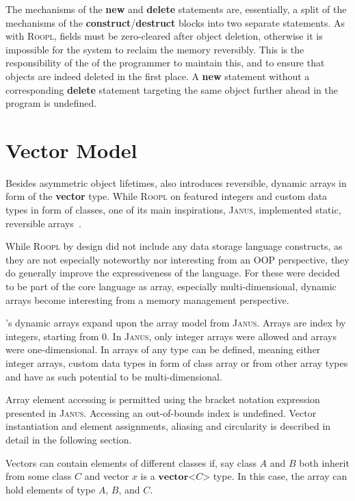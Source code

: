 The mechanisms of the \textbf{new} and \textbf{delete} statements are, essentially, a split of the mechanisms of the \textbf{construct}/\textbf{destruct} blocks into two separate statements. As with \textsc{Roopl}, fields must be zero-cleared after object deletion, otherwise it is impossible for the system to reclaim the memory reversibly. This is the responsibility of the of the programmer to maintain this, and to ensure that objects are indeed deleted in the first place. A \textbf{new} statement without a corresponding \textbf{delete} statement targeting the same object further ahead in the program is undefined.


\section{Vector Model}
\label{sec:vector-model}
Besides asymmetric object lifetimes, \rooplpp also introduces reversible, dynamic arrays in form of the \textbf{vector} type. While \textsc{Roopl} on featured integers and custom data types in form of classes, one of its main inspirations, \textsc{Janus}, implemented static, reversible arrays~\cite{ty:janus}.

While \textsc{Roopl} by design did not include any data storage language constructs, as they are not especially noteworthy nor interesting from an OOP perspective, they do generally improve the expressiveness of the language. For \rooplpp these were decided to be part of the core language as array, especially multi-dimensional, dynamic arrays become interesting from a memory management perspective.

\rooplpp's dynamic arrays expand upon the array model from \textsc{Janus}. Arrays are index by integers, starting from 0. In \textsc{Janus}, only integer arrays were allowed and arrays were one-dimensional. In \rooplpp arrays of any type can be defined, meaning either integer arrays, custom data types in form of class array or from other array types and have as such potential to be multi-dimensional. 

Array element accessing is permitted using the bracket notation expression presented in \textsc{Janus}. Accessing an out-of-bounds index is undefined.
Vector instantiation and element assignments, aliasing and circularity is described in detail in the following section.

Vectors can contain elements of different classes if, say class $A$ and $B$ both inherit from some class $C$ and vector $x$ is a $\textbf{vector}\texttt{<}C\texttt{>}$ type. In this case, the array can hold elements of type $A$, $B$, and $C$.

